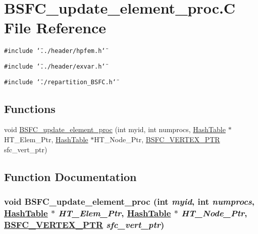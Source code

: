 \hypertarget{BSFC__update__element__proc_8C}{
\section{BSFC\_\-update\_\-element\_\-proc.C File Reference}
\label{BSFC__update__element__proc_8C}
}
{\tt \#include \char`\"{}../header/hpfem.h\char`\"{}}\par
{\tt \#include \char`\"{}../header/exvar.h\char`\"{}}\par
{\tt \#include \char`\"{}./repartition\_\-BSFC.h\char`\"{}}\par
\subsection*{Functions}
\begin{CompactItemize}
\item 
void \hyperlink{BSFC__update__element__proc_8C_a0}{BSFC\_\-update\_\-element\_\-proc} (int myid, int numprocs, \hyperlink{classHashTable}{Hash\-Table} $\ast$HT\_\-Elem\_\-Ptr, \hyperlink{classHashTable}{Hash\-Table} $\ast$HT\_\-Node\_\-Ptr, \hyperlink{structsfc__vertex}{BSFC\_\-VERTEX\_\-PTR} sfc\_\-vert\_\-ptr)
\end{CompactItemize}


\subsection{Function Documentation}
\hypertarget{BSFC__update__element__proc_8C_a0}{
\subsubsection[BSFC\_\-update\_\-element\_\-proc]{\setlength{\rightskip}{0pt plus 5cm}void BSFC\_\-update\_\-element\_\-proc (int {\em myid}, int {\em numprocs}, \hyperlink{classHashTable}{Hash\-Table} $\ast$ {\em HT\_\-Elem\_\-Ptr}, \hyperlink{classHashTable}{Hash\-Table} $\ast$ {\em HT\_\-Node\_\-Ptr}, \hyperlink{structsfc__vertex}{BSFC\_\-VERTEX\_\-PTR} {\em sfc\_\-vert\_\-ptr})}}
\label{BSFC__update__element__proc_8C_a0}


